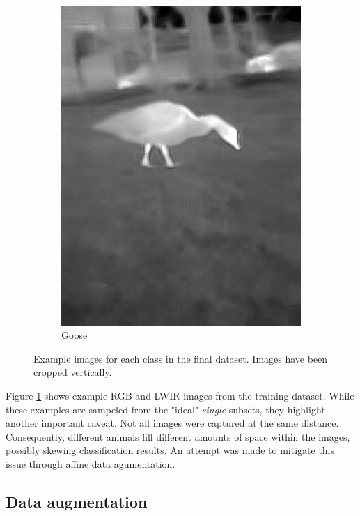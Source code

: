 \documentclass{l4proj}
\begin{document}
\begin{figure}[ht]
\begin{subfigure}[h!]{0.18\textwidth}
    \includegraphics[width=\textwidth, trim={0cm 2.5cm 0cm 2.5cm}, clip]{images/dataset/goose/lwir.png}
    \caption{Goose}
  \end{subfigure}
  \caption{Example images for each class in the final dataset. Images have been cropped vertically.}
  \label{fig:dataset_classes}
\end{figure}

Figure \ref{fig:dataset_classes} shows example RGB and LWIR images from the training dataset. While these examples are sampeled from the "ideal" \textit{single} subsets, they highlight another important caveat. Not all images were captured at the same distance. Consequently, different animals fill different amounts of space within the images, possibly skewing classification results. An attempt was made to mitigate this issue through affine data agumentation.

\subsection{Data augmentation}
\end{document}
